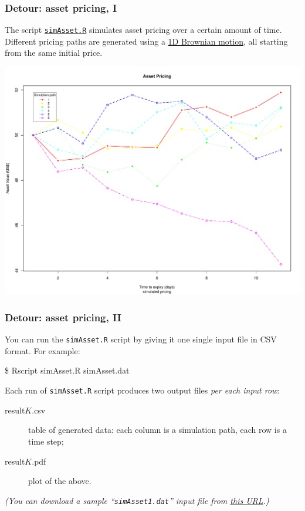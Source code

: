 \documentclass[english,serif,mathserif,xcolor=pdftex,dvipsnames,table]{beamer}
\begin{document}
\begin{frame}
  \frametitle{Detour: asset pricing, I}
  \small The script
  \href{https://raw.githubusercontent.com/riccardomurri/python-for-science-intro/master/download/simAsset.R}{\texttt{simAsset.R}}
  simulates asset pricing over a certain amount of time. Different pricing paths
  are generated using a \href{https://en.wikipedia.org/wiki/Wiener_process}{1D
    Brownian motion}, all starting from the same initial price.
  \begin{center}
    \includegraphics[width=0.75\linewidth]{fig/simAsset.pdf}
  \end{center}
\end{frame}


\begin{frame}[fragile]
  \frametitle{Detour: asset pricing, II}
  \small You can run the \texttt{simAsset.R} script by giving it one single
  input file in CSV format.  For example:
\begin{semiverbatim}
  \$ Rscript simAsset.R simAsset.dat
\end{semiverbatim}

  \+ Each run of \texttt{simAsset.R} script produces two output files \emph{per
    each input row}:
  \begin{description}
  \item[result$K$.csv] table of generated data: each column is a simulation path, each row is a time step;
  \item[result$K$.pdf] plot of the above.
  \end{description}

  \+ \footnotesize
  {\em (You can download a sample ``\texttt{simAsset1.dat}'' input file from
    \href{https://raw.githubusercontent.com/riccardomurri/python-for-science-intro/master/download/}{this
      URL}.)}
\end{frame}
\end{document}
